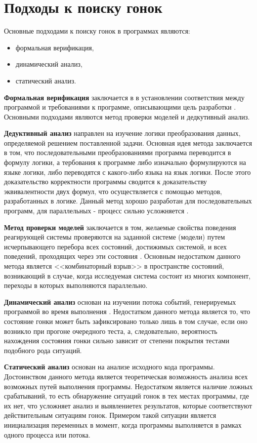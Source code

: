 \chapter{Подходы к поиску гонок}
\label{cha:methods}

Основные подходами к поиску гонок в программах являются:
\begin{itemize}
\item формальная верификация,
\item динамический анализ,
\item статический анализ.
\end{itemize}

\textbf{Формальная верификация} заключается в в установлении соответствия между
программой и требованиями к программе, описывающими цель разработки
\cite{kropacheva-formal-verification}. Основными подходами являются
метод проверки моделей и дедкутивный анализ.

\textbf{Дедуктивный анализ} направлен на изучение логики преобразования данных,
определяемой решением поставленной задачи. Основная идея метода заключается
в том, что последовательными преобразованиями программа переводится в формулу
логики, а тербования к программе либо изначально формулируются на языке
логики, либо переводятся с какого-либо языка на язык логики. После этого доказательство корректности программы сводится к доказательству
эквивалентности двух формул, что осуществляется с помощью методов,
разработанных в логике. Данный метод хорошо разработан для последовательных
программ, для параллельных - процесс сильно усложняется
\cite{kropacheva-formal-verification}.

\textbf{Метод проверки моделей} заключается в том, желаемые свойства поведения
реагирующей системы проверяются на заданной системе (модели) путем
исчерпывающего перебора всех состояний, достижимых системой, и всех поведений,
проходящих через эти состояния \cite{klark-model-checking}. Основным недостатком
данного метода является <<комбинаторный взрыв>> в пространстве состояний,
возникающий в случае, когда исследуемая система состоит из многих компонент,
переходы в которых выполняются параллельно.

\textbf{Динамический анализ} основан на изучении потока событий, генерируемых
программой во время выполнения \cite{kovega-dynamic-analysis}. Недостатком
данного метода является то, что состояние гонки может быть зафиксировано
только лишь в том случае, если оно возникло при прогоне очередного теста,
а, следовательно, вероятность нахождения состояния гонки сильно зависит от
степени покрытия тестами подобного рода ситуаций.

\textbf{Статический анализ} основан на анализе исходного кода программы.
Достоинством данного метода является теоретическая возможность анализа
всех возможных путей выполнения программы. Недостатком является наличие ложных
срабатываний, то есть обнаружение ситуаций гонок в тех местах программы,
где их нет, что усложняет анализ и выявлениетех результатов, которые
соответствуют действительным ситуациям гонок. Примером такой ситуации
является инициализация переменных в момент, когда программы выполняется
в рамках одного процесса или потока.

